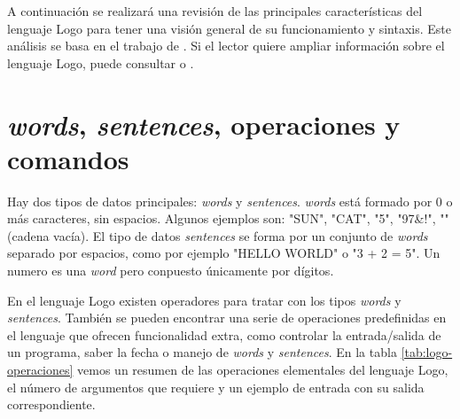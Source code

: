 A continuación se realizará una revisión de las principales características del lenguaje Logo para tener una visión general de su funcionamiento y sintaxis. Este análisis se basa en el trabajo de \cite[p.274-305]{feurzeig1969programming}. Si el lector quiere ampliar información sobre el lenguaje Logo, puede consultar \cite{friendly2014advanced} o \cite{logo-resources}.


\section{\emph{words}, \emph{sentences}, operaciones y comandos}

Hay dos tipos de datos principales: \emph{words} y \emph{sentences}. \emph{words} está formado por 0 o más caracteres, sin espacios. Algunos ejemplos son: "SUN", "CAT", "5",  "97&!", "" (cadena vacía). El tipo de datos \emph{sentences} se forma por un conjunto de \emph{words} separado por espacios, como por ejemplo "HELLO WORLD" o "3 + 2 = 5". Un numero es una \emph{word} pero conpuesto únicamente por dígitos.

En el lenguaje Logo existen operadores para tratar con los tipos \emph{words} y \emph{sentences}. También se pueden encontrar una serie de operaciones predefinidas en el lenguaje que ofrecen funcionalidad extra, como controlar la entrada/salida de un programa, saber la fecha o manejo de \emph{words} y \emph{sentences}. En la tabla \ref{tab:logo-operaciones} vemos un resumen de las operaciones elementales del lenguaje Logo, el número de argumentos que requiere y un ejemplo de entrada con su salida correspondiente.


